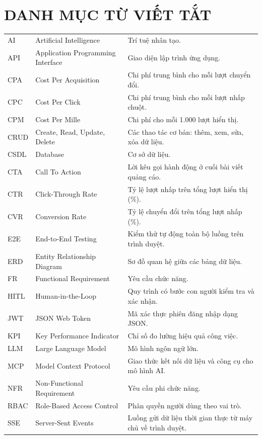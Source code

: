 \chapter*{DANH MỤC TỪ VIẾT TẮT}

\begin{spacing}{1.0}
\footnotesize
\renewcommand{\arraystretch}{1.08}
\noindent\begin{tabularx}{\textwidth}{|L{2.3cm}|L{5.4cm}|Y|}
\hline
{} &  & \\
\hline
AI & Artificial Intelligence & Trí tuệ nhân tạo.\\
\hline
API & Application Programming Interface & Giao diện lập trình ứng dụng.\\
\hline
CPA & Cost Per Acquisition & Chi phí trung bình cho mỗi lượt chuyển đổi.\\
\hline
CPC & Cost Per Click & Chi phí trung bình cho mỗi lượt nhấp chuột.\\
\hline
CPM & Cost Per Mille & Chi phí cho mỗi 1.000 lượt hiển thị.\\
\hline
CRUD & Create, Read, Update, Delete & Các thao tác cơ bản: thêm, xem, sửa, xóa dữ liệu.\\
\hline
CSDL & Database & Cơ sở dữ liệu.\\
\hline
CTA & Call To Action & Lời kêu gọi hành động ở cuối bài viết quảng cáo.\\
\hline
CTR & Click-Through Rate & Tỷ lệ lượt nhấp trên tổng lượt hiển thị (\%).\\
\hline
CVR & Conversion Rate & Tỷ lệ chuyển đổi trên tổng lượt nhấp (\%).\\
\hline
E2E & End-to-End Testing & Kiểm thử tự động toàn bộ luồng trên trình duyệt.\\
\hline
ERD & Entity Relationship Diagram & Sơ đồ quan hệ giữa các bảng dữ liệu.\\
\hline
FR & Functional Requirement & Yêu cầu chức năng.\\
\hline
HITL & Human-in-the-Loop & Quy trình có bước con người kiểm tra và xác nhận.\\
\hline
JWT & JSON Web Token & Mã xác thực phiên đăng nhập dạng JSON.\\
\hline
KPI & Key Performance Indicator & Chỉ số đo lường hiệu quả công việc.\\
\hline
LLM & Large Language Model & Mô hình ngôn ngữ lớn.\\
\hline
MCP & Model Context Protocol & Giao thức kết nối dữ liệu và công cụ cho mô hình AI.\\
\hline
NFR & Non-Functional Requirement & Yêu cầu phi chức năng.\\
\hline
RBAC & Role-Based Access Control & Phân quyền người dùng theo vai trò.\\
\hline
SSE & Server-Sent Events & Luồng gửi dữ liệu thời gian thực từ máy chủ về trình duyệt.\\
\hline
\end{tabularx}
\end{spacing}

